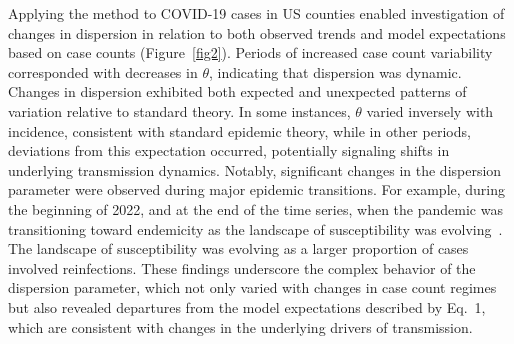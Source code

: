 \documentclass[11pt,letterpaper]{article}
\begin{document}
Applying the method to COVID-19 cases in US counties enabled investigation of changes in dispersion in relation to both observed trends and model expectations based on case counts (Figure~\ref{fig2}).  
Periods of increased case count variability corresponded with decreases in $\theta$, indicating that dispersion was dynamic. 
Changes in dispersion exhibited both expected and unexpected patterns of variation relative to standard theory.  
In some instances, $\theta$ varied inversely with incidence, consistent with standard epidemic theory, while in other periods, deviations from this expectation occurred, potentially signaling shifts in underlying transmission dynamics.  
Notably, significant changes in the dispersion parameter were observed during major epidemic transitions.
For example, during the beginning of 2022, and at the end of the time series, when the pandemic was transitioning toward endemicity as the landscape of susceptibility was evolving~\citep{lavine2021immunological}.  
The landscape of susceptibility was evolving as a larger proportion of cases involved reinfections.  
These findings underscore the complex behavior of the dispersion parameter, which not only varied with changes in case count regimes but also revealed departures from the model expectations described by Eq.~1, which are consistent with changes in the underlying drivers of transmission. 
\end{document}
